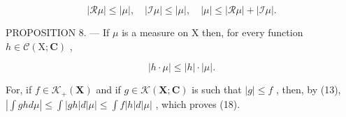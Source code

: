 \[
| \mathcal {R} \mu | \leqslant | \mu |, \quad | \mathcal {I} \mu | \leqslant | \mu |, \quad | \mu | \leqslant | \mathcal {R} \mu | + | \mathcal {I} \mu |.\tag{17}
\]

PROPOSITION 8. --- If \(\mu\) is a measure on X then, for every function \(h \in \mathcal{C}(\mathrm{X};\mathbf{C})\) ,

\[
\left| h \cdot \mu \right| \leqslant \left| h \right| \cdot \left| \mu \right|.\tag{18}
\]

For, if \(f \in \mathcal{K}_+(\mathbf{X})\) and if \(g \in \mathcal{K}(\mathbf{X};\mathbf{C})\) is such that \(|g| \leqslant f\) , then, by (13), \(|\int gh d\mu| \leqslant \int |gh| d|\mu| \leqslant \int f|h| d|\mu|\) , which proves (18).

